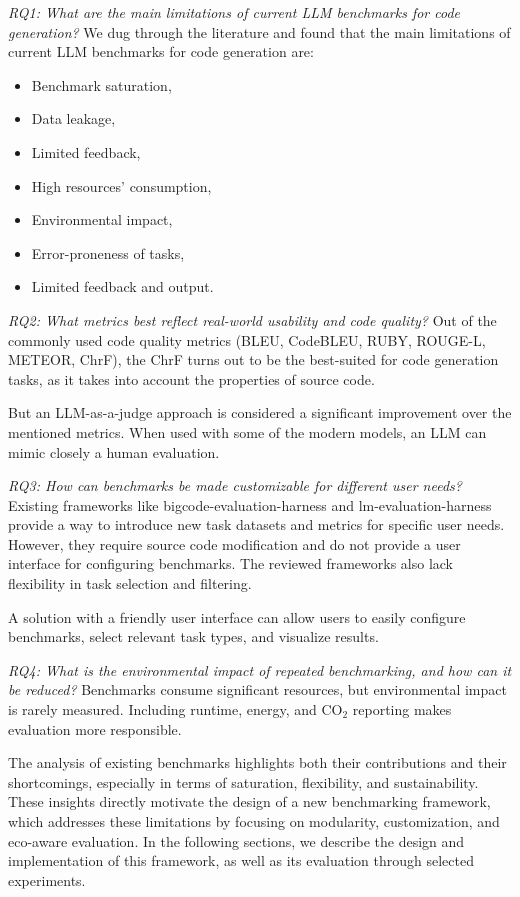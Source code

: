 \textit{RQ1: What are the main limitations of current LLM benchmarks for code generation?}
We dug through the literature and found that the main limitations of current LLM benchmarks for code generation are:

\begin{itemize}
    \item Benchmark saturation,
    \item Data leakage,
    \item Limited feedback,
    \item High resources' consumption,
    \item Environmental impact,
    \item Error-proneness of tasks,
    \item Limited feedback and output.
\end{itemize}

\textit{RQ2: What metrics best reflect real-world usability and code quality?}
Out of the commonly used code quality metrics (BLEU, CodeBLEU, RUBY, ROUGE-L, METEOR, ChrF), the ChrF turns out to be the best-suited for code generation tasks, as it takes into account the properties of source code.

But an LLM-as-a-judge approach is considered a significant improvement over the mentioned metrics.
When used with some of the modern models, an LLM can mimic closely a human evaluation.

\textit{RQ3: How can benchmarks be made customizable for different user needs?}
Existing frameworks like bigcode-evaluation-harness and lm-evaluation-harness provide a way to introduce new task datasets and metrics for specific user needs.
However, they require source code modification and do not provide a user interface for configuring benchmarks.
The reviewed frameworks also lack flexibility in task selection and filtering.

A solution with a friendly user interface can allow users to easily configure benchmarks, select relevant task types, and visualize results.

\textit{RQ4: What is the environmental impact of repeated benchmarking, and how can it be reduced?}
Benchmarks consume significant resources, but environmental impact is rarely measured. Including runtime, energy, and CO$_2$ reporting makes evaluation more responsible.


The analysis of existing benchmarks highlights both their contributions and their shortcomings, especially in terms of saturation, flexibility, and sustainability.
These insights directly motivate the design of a new benchmarking framework, which addresses these limitations by focusing on modularity, customization, and eco-aware evaluation.
In the following sections, we describe the design and implementation of this framework, as well as its evaluation through selected experiments.



